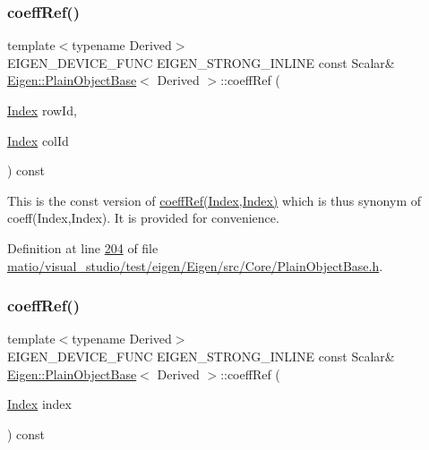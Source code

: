 \subsubsection{\texorpdfstring{coeff\+Ref()}{coeffRef()}\hspace{0.1cm}{\footnotesize\ttfamily [6/8]}}
{\footnotesize\ttfamily template$<$typename Derived$>$ \\
E\+I\+G\+E\+N\+\_\+\+D\+E\+V\+I\+C\+E\+\_\+\+F\+U\+NC E\+I\+G\+E\+N\+\_\+\+S\+T\+R\+O\+N\+G\+\_\+\+I\+N\+L\+I\+NE const Scalar\& \hyperlink{class_eigen_1_1_plain_object_base}{Eigen\+::\+Plain\+Object\+Base}$<$ Derived $>$\+::coeff\+Ref (\begin{DoxyParamCaption}\item[{\hyperlink{namespace_eigen_a62e77e0933482dafde8fe197d9a2cfde}{Index}}]{row\+Id,  }\item[{\hyperlink{namespace_eigen_a62e77e0933482dafde8fe197d9a2cfde}{Index}}]{col\+Id }\end{DoxyParamCaption}) const\hspace{0.3cm}{\ttfamily [inline]}}

This is the const version of \hyperlink{class_eigen_1_1_plain_object_base_a25626a55b26a4323565f79d1b7c48ea8}{coeff\+Ref(\+Index,\+Index)} which is thus synonym of coeff(\+Index,\+Index). It is provided for convenience. 

Definition at line \hyperlink{matio_2visual__studio_2test_2eigen_2_eigen_2src_2_core_2_plain_object_base_8h_source_l00204}{204} of file \hyperlink{matio_2visual__studio_2test_2eigen_2_eigen_2src_2_core_2_plain_object_base_8h_source}{matio/visual\+\_\+studio/test/eigen/\+Eigen/src/\+Core/\+Plain\+Object\+Base.\+h}.

\mbox{\label{class_eigen_1_1_plain_object_base_a982b56223d011e2f836a3408983883d4}} 
\subsubsection{\texorpdfstring{coeff\+Ref()}{coeffRef()}\hspace{0.1cm}{\footnotesize\ttfamily [7/8]}}
{\footnotesize\ttfamily template$<$typename Derived$>$ \\
E\+I\+G\+E\+N\+\_\+\+D\+E\+V\+I\+C\+E\+\_\+\+F\+U\+NC E\+I\+G\+E\+N\+\_\+\+S\+T\+R\+O\+N\+G\+\_\+\+I\+N\+L\+I\+NE const Scalar\& \hyperlink{class_eigen_1_1_plain_object_base}{Eigen\+::\+Plain\+Object\+Base}$<$ Derived $>$\+::coeff\+Ref (\begin{DoxyParamCaption}\item[{\hyperlink{namespace_eigen_a62e77e0933482dafde8fe197d9a2cfde}{Index}}]{index }\end{DoxyParamCaption}) const\hspace{0.3cm}{\ttfamily [inline]}}

